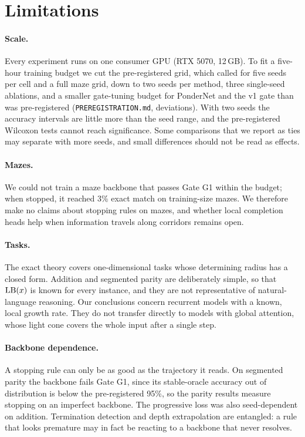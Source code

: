 \section{Limitations}
\label{sec:limitations}

\paragraph{Scale.} Every experiment runs on one consumer GPU (RTX 5070, 12\,GB). To fit a five-hour
training budget we cut the pre-registered grid, which called for five seeds per cell and a full maze
grid, down to two seeds per method, three single-seed ablations, and a smaller gate-tuning budget for
PonderNet and the v1 gate than was pre-registered (\texttt{PREREGISTRATION.md}, deviations). With two
seeds the accuracy intervals are little more than the seed range, and the pre-registered Wilcoxon tests
cannot reach significance. Some comparisons that we report as ties may separate with more seeds, and
small differences should not be read as effects.

\paragraph{Mazes.} We could not train a maze backbone that passes Gate G1 within the budget; when
stopped, it reached 3\% exact match on training-size mazes. We therefore make no claims about stopping
rules on mazes, and whether local completion heads help when information travels along corridors
remains open.

\paragraph{Tasks.} The exact theory covers one-dimensional tasks whose determining radius has a closed
form. Addition and segmented parity are deliberately simple, so that $\operatorname{LB}(x)$ is known for every
instance, and they are not representative of natural-language reasoning. Our conclusions concern
recurrent models with a known, local growth rate. They do not transfer directly to models with global
attention, whose light cone covers the whole input after a single step.

\paragraph{Backbone dependence.} A stopping rule can only be as good as the trajectory it reads. On
segmented parity the backbone fails Gate G1, since its stable-oracle accuracy out of distribution is
below the pre-registered 95\%, so the parity results measure stopping on an imperfect backbone. The
progressive loss was also seed-dependent on addition. Termination detection and depth extrapolation
are entangled: a rule that looks premature may in fact be reacting to a backbone that never resolves.

